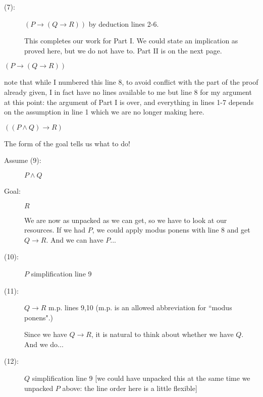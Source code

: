 \documentclass[12pt]{article}
\begin{document}
\begin{description}
\begin{description}
\item[(7):]  $(P \rightarrow (Q \rightarrow R))$ by deduction lines 2-6.

This completes our work for Part I.  We could state an implication as proved here, but we do not have to.  Part II is on the next page.

\newpage


\end{description}

\item[Part II:] 

\begin{description}

\item

\item [Assume (8):] $(P \rightarrow (Q \rightarrow R))$

note that while I numbered this line 8, to avoid conflict with the part of the proof already given, I in fact have no lines available to me
but line 8 for my argument at this point:  the argument of Part I is over, and everything in lines 1-7 depends on the assumption in line 1 which we are no longer making here.

\item[Goal (of part II):] $((P \wedge Q) \rightarrow R)$

The form of the goal tells us what to do!

\begin{description}

\item[Assume (9):]  $P \wedge Q$

\item[Goal:]  $R$

We are now as unpacked as we can get, so we have to look at our resources.  If we had $P$, we could apply modus ponens with line 8 and get $Q \rightarrow R$.  And we can have $P$...

\item[(10):]  $P$ simplification line 9

\item[(11):]  $Q \rightarrow R$  m.p. lines 9,10 (m.p. is an allowed abbreviation for ``modus ponens".)

Since we have $Q \rightarrow R$, it is natural to think about whether we have $Q$.  And we do...

\item[(12):]  $Q$ simplification line 9  [we could have unpacked this at the same time we unpacked $P$ above:  the line order here is a little flexible]


\end{description}
\end{description}
\end{description}
\end{document}
